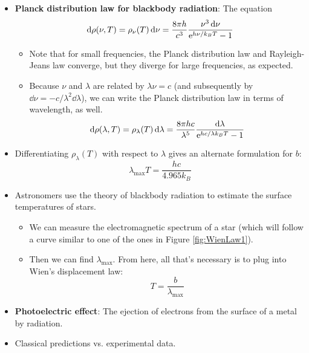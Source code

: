 \documentclass[../notes.tex]{subfiles}
\begin{document}
\begin{itemize}
    \item \textbf{Planck distribution law for blackbody radiation}: The equation
    \begin{equation*}
        \dd{\rho(\nu,T)} = \rho_\nu(T)\dd{\nu} = \frac{8\pi h}{c^3}\frac{\nu^3\dd{\nu}}{\e[h\nu/k_BT]-1}
    \end{equation*}
    \begin{itemize}
        \item Note that for small frequencies, the Planck distribution law and Rayleigh-Jeans law converge, but they diverge for large frequencies, as expected.
        \item Because $\nu$ and $\lambda$ are related by $\lambda\nu=c$ (and subsequently by $\dd{\nu}=-c/\lambda^2\dd{\lambda}$), we can write the Planck distribution law in terms of wavelength, as well.
        \begin{equation*}
            \dd{\rho(\lambda,T)} = \rho_\lambda(T)\dd{\lambda} = \frac{8\pi hc}{\lambda^5}\frac{\dd{\lambda}}{\e[hc/\lambda k_BT]-1}
        \end{equation*}
    \end{itemize}
    \item Differentiating $\rho_\lambda(T)$ with respect to $\lambda$ gives an alternate formulation for $b$:
    \begin{equation*}
        \lambda_\text{max}T = \frac{hc}{4.965k_B}
    \end{equation*}
    \item Astronomers use the theory of blackbody radiation to estimate the surface temperatures of stars.
    \begin{itemize}
        \item We can measure the electromagnetic spectrum of a star (which will follow a curve similar to one of the ones in Figure \ref{fig:WienLaw1}).
        \item Then we can find $\lambda_\text{max}$. From here, all that's necessary is to plug into Wien's displacement law:
        \begin{equation*}
            T = \frac{b}{\lambda_\text{max}}
        \end{equation*}
    \end{itemize}
    \item {}\textbf{Photoelectric effect}: The ejection of electrons from the surface of a metal by radiation.
    \item Classical predictions vs. experimental data.
    \begin{itemize}

\end{itemize}
\end{itemize}
\end{document}
